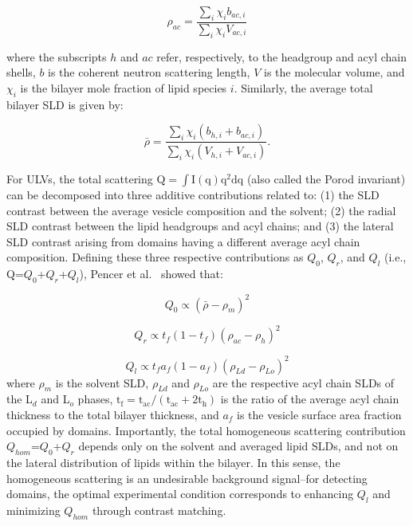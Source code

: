\documentclass[8.5pt,twoside,twocolumn]{article}
\begin{document}
\begin{equation}
\label{eq.Fred2}
	\rho_{ac}= \frac{\sum_{i} \chi_i b_{ac,i}}{\sum_{i}\chi_i V_{ac,i}}
\end{equation}


\noindent where the subscripts $h$ and $ac$ refer, respectively, to the headgroup and acyl chain shells, $b$ is the coherent neutron scattering length, $V$ is the molecular volume, and $\chi_i$ is the bilayer mole fraction of lipid species $i$. Similarly, the average total bilayer SLD is given by:

\begin{equation}
\label{eq.Fred3}
	\bar{\rho}= \frac{\sum_{i} \chi_i (b_{h,i}+b_{ac,i})}{\sum_{i}\chi_i( V_{h,i}+V_{ac,i})}.
\end{equation}

For ULVs, the total scattering $\mathrm{Q=\int I(q) q^2 dq}$ (also called the Porod invariant) can be decomposed into three additive contributions related to: (1) the SLD contrast between the average vesicle composition and the solvent; (2) the radial SLD contrast between the lipid headgroups and acyl chains; and (3) the lateral SLD contrast arising from domains having a different average acyl chain composition. Defining these three respective contributions as $Q_0$, $Q_r$, and $Q_l$ (i.e., Q=$Q_0$+$Q_r$+$Q_l$), Pencer et al.~\cite{Pencer.2006} showed that:

\begin{equation}
\label{eq.Fred4}
	Q_0 \propto (\bar{\rho}-\rho_m)^2
\end{equation}

\begin{equation}
\label{eq.Fred5}
	Q_r \propto t_f(1-t_f)(\rho_{ac}-\rho_h)^2
\end{equation}

\begin{equation}
\label{eq.Fred6}
	Q_l \propto t_fa_f(1-a_f)(\rho_{Ld}-\rho_{Lo})^2
\end{equation}
where $\rho_m$ is the solvent SLD, $\rho_{Ld}$ and $\rho_{Lo}$ are the respective acyl chain SLDs of the L$_d$ and L$_o$ phases, $\mathrm{t_f=t_{ac}/(t_{ac}+2t_h)}$ is the ratio of the average acyl chain thickness to the total bilayer thickness, and $a_f$ is the vesicle surface area fraction occupied by domains. Importantly, the total homogeneous scattering contribution $Q_{hom}$=$Q_0$+$Q_r$ depends only on the solvent and averaged lipid SLDs, and not on the lateral distribution of lipids within the bilayer. In this sense, the homogeneous scattering is an undesirable background signal--for detecting domains, the optimal experimental condition corresponds to enhancing $Q_l$ and minimizing $Q_{hom}$ through contrast matching.
\end{document}
